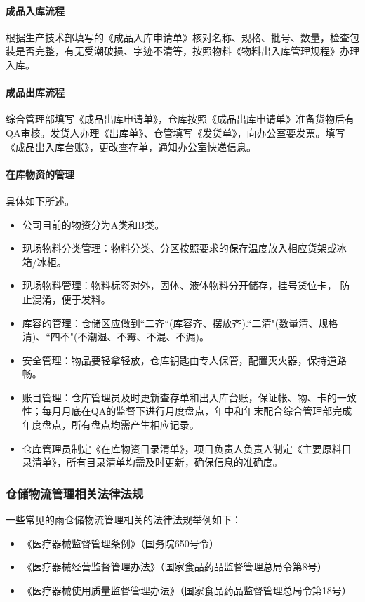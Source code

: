 \documentclass[cn,black,12pt,normal]{elegantnote}
\begin{document}
\paragraph{成品入库流程} 根据生产技术部填写的《成品入库申请单》核对名称、规格、批号、数量，检查包装是否完整，有无受潮破损、字迹不清等，按照物料《物料出入库管理规程》办理入库。

\paragraph{成品出库流程} 综合管理部填写《成品出库申请单》，仓库按照《成品出库申请单》准备货物后有QA审核。发货人办理《出库单》、仓管填写《发货单》，向办公室要发票。填写《成品出入库台账》，更改查存单，通知办公室快递信息。

\paragraph{在库物资的管理} 具体如下所述。
\begin{itemize}
    \item 公司目前的物资分为A类和B类。
    \item 现场物料分类管理：物料分类、分区按照要求的保存温度放入相应货架或冰箱/冰柜。
    \item 现场物料管理：物料标签对外，固体、液体物料分开储存，挂号货位卡， 防止混淆，便于发料。
    \item 库容的管理：仓储区应做到“二齐“(库容齐、摆放齐).“二清"(数量清、规格清)、“四不"(不潮湿、不霉、不混、不漏)。
    \item 安全管理：物品要轻拿轻放，仓库钥匙由专人保管，配置灭火器，保持道路畅。
    \item 账目管理：仓库管理员及时更新查存单和出入库台账，保证帐、物、卡的一致性；每月月底在QA的监督下进行月度盘点，年中和年末配合综合管理部完成年度盘点，所有盘点均需产生相应记录。
    \item 仓库管理员制定《在库物资目录清单》，项目负责人负责人制定《主要原料目录清单》，所有目录清单均需及时更新，确保信息的准确度。
\end{itemize}

\subsubsection{仓储物流管理相关法律法规}
一些常见的雨仓储物流管理相关的法律法规举例如下：
\begin{itemize}
    \item 《医疗器械监督管理条例》（国务院650号令）
    \item 《医疗器械经营监督管理办法》（国家食品药品监督管理总局令第8号）
    \item 《医疗器械使用质量监督管理办法》（国家食品药品监督管理总局令第18号）
\end{itemize}
\end{document}
